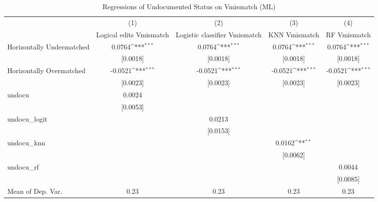 \begin{table}[htbp]\centering
\def\sym#1{\ifmmode^{#1}\else\(^{#1}\)\fi}
\caption{Regressions of Undocumented Status on Vmismatch (ML)}
\begin{tabular}{l*{4}{c}}
\toprule
                    &\multicolumn{1}{c}{(1)}         &\multicolumn{1}{c}{(2)}         &\multicolumn{1}{c}{(3)}         &\multicolumn{1}{c}{(4)}         \\
                    &Logical edits Vmismatch         &Logistic classifier Vmismatch         &KNN Vmismatch         &RF Vmismatch         \\
\midrule
Horizontally Undermatched&      0.0764\sym{***}&      0.0764\sym{***}&      0.0764\sym{***}&      0.0764\sym{***}\\
                    &    [0.0018]         &    [0.0018]         &    [0.0018]         &    [0.0018]         \\
\addlinespace
Horizontally Overmatched&     -0.0521\sym{***}&     -0.0521\sym{***}&     -0.0521\sym{***}&     -0.0521\sym{***}\\
                    &    [0.0023]         &    [0.0023]         &    [0.0023]         &    [0.0023]         \\
\addlinespace
undocu              &      0.0024         &                     &                     &                     \\
                    &    [0.0053]         &                     &                     &                     \\
\addlinespace
undocu\_logit        &                     &      0.0213         &                     &                     \\
                    &                     &    [0.0153]         &                     &                     \\
\addlinespace
undocu\_knn          &                     &                     &      0.0162\sym{**} &                     \\
                    &                     &                     &    [0.0062]         &                     \\
\addlinespace
undocu\_rf           &                     &                     &                     &      0.0044         \\
                    &                     &                     &                     &    [0.0085]         \\
\midrule
Mean of Dep. Var.   &        0.23         &        0.23         &        0.23         &        0.23         \\

\end{tabular}
\end{table}
